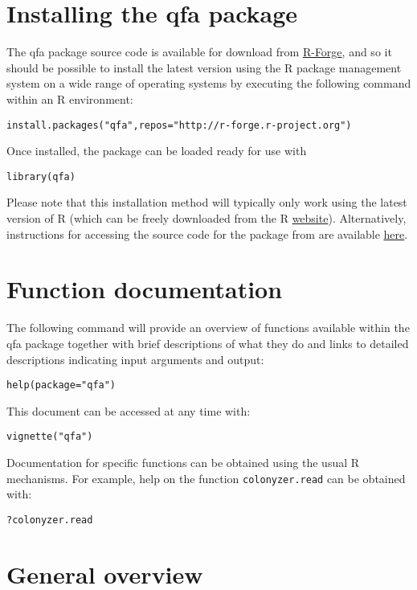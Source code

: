 \documentclass [a4paper]{article}
\begin{document}
\section{Installing the qfa package}

The qfa package source code is available for download from \href{http://r-forge.r-project.org/projects/qfa}{R-Forge}, and so it should be possible to install the latest version using the R package management system on a wide range of operating systems by executing the following command within an R environment: 
\begin{verbatim}
install.packages("qfa",repos="http://r-forge.r-project.org")
\end{verbatim}

Once installed, the package can be loaded ready for use with
\begin{verbatim}
library(qfa)
\end{verbatim}

Please note that this installation method will typically only work using the latest version of R (which can be freely downloaded from the R \href{http://www.r-project.org/}{website}).  Alternatively, instructions for accessing the source code for the package from are available \href{http://r-forge.r-project.org/scm/?group_id=880}{here}.

\section{Function documentation}

The following command will provide an overview of functions available within the qfa package together with brief descriptions of what they do and links to detailed descriptions indicating input arguments and output:
\begin{verbatim}
help(package="qfa")
\end{verbatim}
This document can be accessed at any time with:
\begin{verbatim}
vignette("qfa")
\end{verbatim}
Documentation for specific functions can be obtained using the usual R mechanisms. For example, help on the function \verb$colonyzer.read$ can be obtained with:
\begin{verbatim}
?colonyzer.read
\end{verbatim}

\section{General overview}
\end{document}
